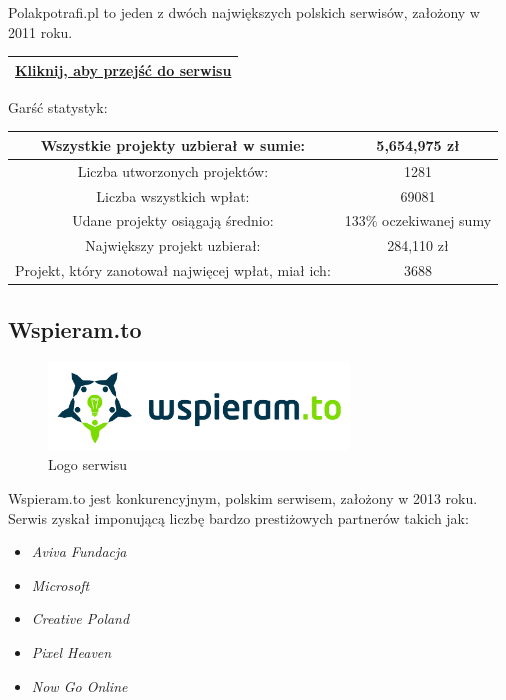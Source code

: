 \documentclass[12pt, a4paper]{article}
\begin{document}
Polakpotrafi.pl to jeden z dwóch największych polskich serwisów, założony w 2011 roku.
\begin{center}
\begin{tabular}{|c|} \hline
\href{www.polakpotrafi.pl}{Kliknij, aby przejść do serwisu}\\ \hline
\end{tabular}
\end{center}
Garść statystyk:

\begin{center}\begin{tabular}{|c|c|} \hline
Wszystkie projekty uzbierał w sumie: & 5,654,975 zł \\ \hline
Liczba utworzonych projektów: & 1281 \\ \hline
Liczba wszystkich wpłat: & 69081 \\ \hline
Udane projekty osiągają średnio: & 133\% oczekiwanej sumy \\ \hline
Największy projekt uzbierał: & 284,110 zł \\ \hline
Projekt, który zanotował najwięcej wpłat, miał ich: & 3688 \\ \hline
\end{tabular}\end{center}

\subsection{Wspieram.to}
\label{sec:wt}

\begin{figure}[ht]
\centering
\includegraphics[width=8cm]{wt}
\caption{Logo serwisu}
\label{fig:obrazek k}
\end{figure}

\newpage

Wspieram.to  jest konkurencyjnym, polskim serwisem, założony w 2013 roku. Serwis zyskał imponującą liczbę bardzo prestiżowych partnerów takich jak:
\begin{itemize}
\item \emph{Aviva Fundacja}
\item \emph{Microsoft}
\item \emph{Creative Poland}
\item \emph{Pixel Heaven}
\item \emph{Now Go Online}
\end{itemize}
\end{document}
